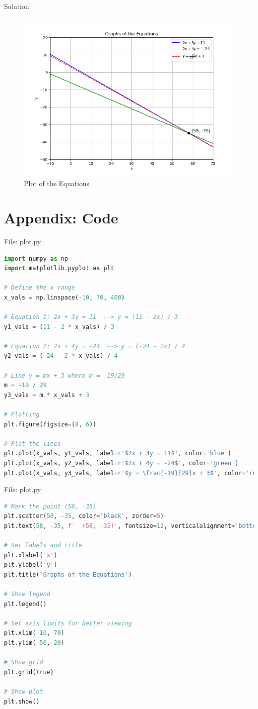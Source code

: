 \documentclass{beamer}
\numberwithin{equation}{section}
\theoremstyle{remark}
\begin{document}
\begin{frame}{Solution}
\begin{figure}[h!]
   \centering
   \includegraphics[width=0.7\linewidth]{figs/01.png}
   \caption{Plot of the Equations}
   \label{Plot_1}
\end{figure}
\end{frame}
\section*{Appendix: Code}
\begin{frame}[fragile]{File: plot.py}
\begin{lstlisting}[language=Python]
import numpy as np
import matplotlib.pyplot as plt

# Define the x range
x_vals = np.linspace(-10, 70, 400)

# Equation 1: 2x + 3y = 11  --> y = (11 - 2x) / 3
y1_vals = (11 - 2 * x_vals) / 3

# Equation 2: 2x + 4y = -24  --> y = (-24 - 2x) / 4
y2_vals = (-24 - 2 * x_vals) / 4

# Line y = mx + 3 where m = -19/29
m = -19 / 29
y3_vals = m * x_vals + 3

# Plotting
plt.figure(figsize=(8, 6))

# Plot the lines
plt.plot(x_vals, y1_vals, label=r'$2x + 3y = 11$', color='blue')
plt.plot(x_vals, y2_vals, label=r'$2x + 4y = -24$', color='green')
plt.plot(x_vals, y3_vals, label=r'$y = \frac{-19}{29}x + 3$', color='red', linestyle='dashed')
\end{lstlisting}
\end{frame}

\begin{frame}[fragile]{File: plot.py}
\begin{lstlisting}[language=Python]
# Mark the point (58, -35)
plt.scatter(58, -35, color='black', zorder=5)
plt.text(58, -35, f'  (58, -35)', fontsize=12, verticalalignment='bottom')

# Set labels and title
plt.xlabel('x')
plt.ylabel('y')
plt.title('Graphs of the Equations')

# Show legend
plt.legend()

# Set axis limits for better viewing
plt.xlim(-10, 70)
plt.ylim(-50, 20)

# Show grid
plt.grid(True)

# Show plot
plt.show()
\end{lstlisting}
\end{frame}
\end{document}
